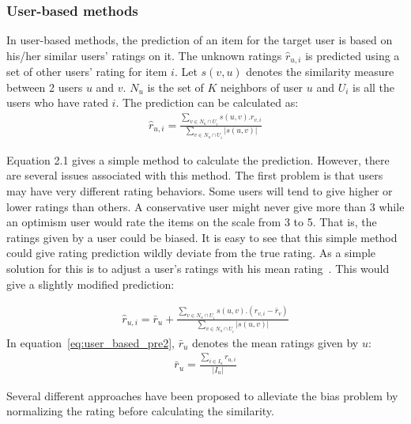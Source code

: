 \documentclass[oneside,13pt]{extreport}
\begin{document}
\subsubsection{User-based methods}
In user-based methods, the prediction of an item for the target user is based on his/her similar users’ ratings on it. The unknown ratings $\hat r_{u,i}$ is predicted using
a set of other users’ rating for item $i$. Let $s\left( {v,u} \right)$ denotes the similarity
measure between 2 users $u$ and $v$. $N_u$ is the set of $K$ neighbors of user $u$ and $U_i$ is all the users who have rated $i$. The prediction can be calculated as:
\begin{eqnarray}
\label{eq:user_based_pre1}
\hat r_{u,i} = \frac{{\sum\limits_{v \in {N_u} \cap {U_i}} {{s\left( {u,v} \right)}.{r_{v,i}}} }}{{\sum\limits_{v \in {N_u} \cap {U_i}} {\left| {s\left( {u,v} \right)} \right|} }}
\end{eqnarray}

Equation 2.1 gives a simple method to calculate the prediction. However, there are several issues associated with this method. The first problem is that users may have very different rating behaviors. Some users will tend to give higher or lower ratings than others. A conservative user might never give more than 3 while an optimism user would rate the items on the scale from 3 to 5. That is, the ratings given by a user could be biased. It is easy to see that this simple method could give rating prediction wildly deviate from the true rating. As a simple solution for this is to adjust a user’s ratings with his mean rating~\cite{Resnick94}. This would give a slightly modified prediction:

\begin{eqnarray}
\label{eq:user_based_pre2}
\hat r_{u,i} = \bar r_u+\frac{{\sum\limits_{v \in {N_u} \cap {U_i}} {{s\left( {u,v} \right)}.({r_{v,i}}-\bar r_v)} }}{{\sum\limits_{v \in {N_u} \cap {U_i}} {\left| {s\left( {u,v} \right)} \right|}}}
\end{eqnarray}
In equation~\ref{eq:user_based_pre2}, $\bar r_u$ denotes the mean ratings given by $u$:
\begin{eqnarray}
\label{eq:mean_rating}
\bar r_u = \frac{{\sum\nolimits_{i \in {I_u}} {{r_{u,i}}} }}{{\left| {{I_u}} \right|}}
\end{eqnarray}

Several different approaches have been proposed to alleviate the bias problem by normalizing the rating before calculating the similarity.
\end{document}
